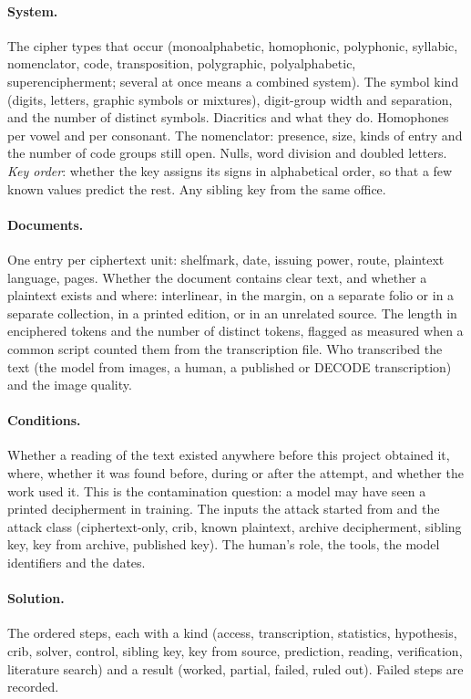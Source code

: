 \documentclass[11pt]{article}
\begin{document}
\paragraph{System.} The cipher types that occur (monoalphabetic, homophonic, polyphonic, syllabic, nomenclator, code, transposition, polygraphic, polyalphabetic, superencipherment; several at once means a combined system). The symbol kind (digits, letters, graphic symbols or mixtures), digit-group width and separation, and the number of distinct symbols. Diacritics and what they do. Homophones per vowel and per consonant. The nomenclator: presence, size, kinds of entry and the number of code groups still open. Nulls, word division and doubled letters. \emph{Key order}: whether the key assigns its signs in alphabetical order, so that a few known values predict the rest. Any sibling key from the same office.

\paragraph{Documents.} One entry per ciphertext unit: shelfmark, date, issuing power, route, plaintext language, pages. Whether the document contains clear text, and whether a plaintext exists and where: interlinear, in the margin, on a separate folio or in a separate collection, in a printed edition, or in an unrelated source. The length in enciphered tokens and the number of distinct tokens, flagged as measured when a common script counted them from the transcription file. Who transcribed the text (the model from images, a human, a published or DECODE transcription) and the image quality.

\paragraph{Conditions.} Whether a reading of the text existed anywhere before this project obtained it, where, whether it was found before, during or after the attempt, and whether the work used it. This is the contamination question: a model may have seen a printed decipherment in training. The inputs the attack started from and the attack class (ciphertext-only, crib, known plaintext, archive decipherment, sibling key, key from archive, published key). The human's role, the tools, the model identifiers and the dates.

\paragraph{Solution.} The ordered steps, each with a kind (access, transcription, statistics, hypothesis, crib, solver, control, sibling key, key from source, prediction, reading, verification, literature search) and a result (worked, partial, failed, ruled out). Failed steps are recorded.
\end{document}
